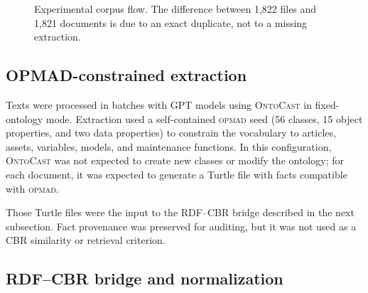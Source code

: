 \documentclass[journal]{IEEEtran}
\newcommand{\OPMAD}{\textsc{opmad}}
\newcommand{\OntoCast}{\textsc{OntoCast}}
\begin{document}
\begin{figure}[!t]
\centering
{}
\caption{Experimental corpus flow. The difference between 1,822 files and 1,821 documents is due to an exact duplicate, not to a missing extraction.}
\label{fig:flow-corpus}
\end{figure}

\subsection{OPMAD-constrained extraction}

Texts were processed in batches with GPT models using \OntoCast{} in fixed-ontology mode. Extraction used a self-contained \OPMAD{} seed (56 classes, 15 object properties, and two data properties) to constrain the vocabulary to articles, assets, variables, models, and maintenance functions. In this configuration, \OntoCast{} was not expected to create new classes or modify the ontology; for each document, it was expected to generate a Turtle file with facts compatible with \OPMAD{}.

Those Turtle files were the input to the RDF--CBR bridge described in the next subsection. Fact provenance was preserved for auditing, but it was not used as a CBR similarity or retrieval criterion.

\subsection{RDF--CBR bridge and normalization}
\end{document}
